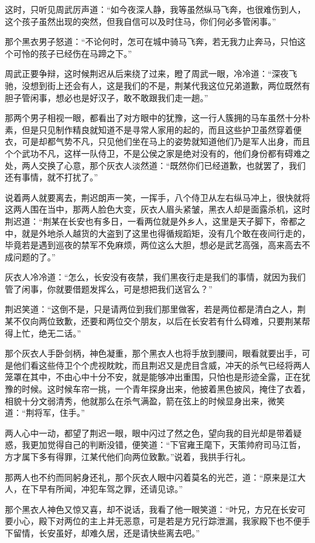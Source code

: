 这时，只听见周武厉声道：“如今夜深人静，我等虽然纵马飞奔，也很难伤到人，这个孩子虽然出现的突然，但我自信可以及时住马，你们何必多管闲事。”

那个黑衣男子怒道：“不论何时，怎可在城中骑马飞奔，若无我力止奔马，只怕这个可怜的孩子已经伤在马蹄之下。”

周武正要争辩，这时候荆迟从后来绕了过来，瞪了周武一眼，冷冷道：“深夜飞驰，没想到街上还会有人，这是我们的不是，荆某代我这位兄弟道歉，两位既然有胆子管闲事，想必也是好汉子，敢不敢跟我们走一趟。”

那两个男子相视一眼，都看出了对方眼中的犹豫，这一行人簇拥的马车虽然十分朴素，但是只见制作精良就知道不是寻常人家用的起的，而且这些护卫虽然穿着便衣，可是却都气势不凡，只见他们坐在马上的姿势就知道他们乃是军人出身，而且个个武功不凡，这样一队侍卫，不是公侯之家是绝对没有的，他们身份都有碍难之处，两人交换了心意，那个灰衣人淡然道：“既然你们已经道歉，也就罢了，我们还有事情，就不打扰了。”

说着两人就要离去，荆迟朗声一笑，一挥手，八个侍卫从左右纵马冲上，很快就将这两人围在当中，那两人脸色大变，灰衣人眉头紧皱，黑衣人却是面露杀机，这时荆迟道：“荆某在长安也有多日，一看两位就是外乡人，这里是天子脚下，帝都之中，就是外地杀人越货的大盗到了这里也得循规蹈矩，没有几个敢在夜间行走的，毕竟若是遇到巡夜的禁军不免麻烦，两位这么大胆，想必是武艺高强，高来高去不成问题的了。”

灰衣人冷冷道：“怎么，长安没有夜禁，我们黑夜行走是我们的事情，就因为我们管了闲事，你就要借题发挥么，可是想把我们送官么？”

荆迟笑道：“这倒不是，只是请两位到我们那里做客，若是两位都是清白之人，荆某不仅向两位致歉，还要和两位交个朋友，以后在长安若有什么碍难，只要荆某帮得上忙，绝无二话。”

那个灰衣人手卧剑柄，神色凝重，那个黑衣人也将手放到腰间，眼看就要出手，可是他们看这些侍卫个个虎视眈眈，而且荆迟又是虎目含威，冲天的杀气已经将两人笼罩在其中，不由心中十分不安，就是能够冲出重围，只怕也是形迹全露，正在犹豫的时候。这时候车帘一挑，一个青年探身出来，他披着黑色披风，掩住了衣着，相貌十分文弱清秀，他就那么在杀气满盈，箭在弦上的时候显身出来，微笑道：“荆将军，住手。”

两人心中一动，都望了荆迟一眼，眼中闪过了然之色，望向我的目光却是带着疑惑，我更加觉得自己的判断没错，便笑道：“下官雍王麾下，天策帅府司马江哲，方才属下多有得罪，江某代他们向两位致歉。”说着，我拱手行礼。

那两人也不约而同躬身还礼，那个灰衣人眼中闪着莫名的光芒，道：“原来是江大人，在下早有所闻，冲犯车驾之罪，还请见谅。”

那个黑衣人神色又惊又喜，却不说话，我看了他一眼笑道：“叶兄，方兄在长安可要小心，殿下对两位的主上并无恶意，可是若是方兄行踪泄漏，我家殿下也不便手下留情，长安虽好，却难久居，还是请快些离去吧。”


